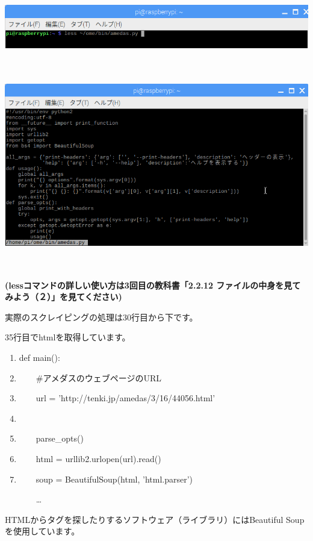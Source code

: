 \documentclass[a4paper,12pt,dvipdfmx]{jarticle}
\begin{document}
\begin{center}
\includegraphics[width=17.006cm,height=2.067cm]{textbook-img036.png}

\end{center}
\begin{center}
\includegraphics[width=17.006cm,height=9.086cm]{textbook-img037.png}

\end{center}
{\bfseries
(lessコマンドの詳しい使い方は3回目の教科書「2.2.12
ファイルの中身を見てみよう（２）」を見てください)%
}


\bigskip

\clearpage
実際のスクレイピングの処理は30行目から下です。

35行目でhtmlを取得しています。

\begin{center}
\begin{boxedminipage}{16.947cm}
\begin{enumerate}
\setlength{\itemsep}{0cm} %
\setcounter{enumi}{29}
\item def main():
\item \ \ \ \ \#アメダスのウェブページのURL
\item \ \ \ \ url = 'http://tenki.jp/amedas/3/16/44056.html'
\item 
\item \ \ \ \ parse\_opts()
\item \ \ \ \ html = urllib2.urlopen(url).read()
\item \ \ \ \ soup = BeautifulSoup(html, 'html.parser')

\ \ \ \ …
\end{enumerate}
\end{boxedminipage}
\end{center}
HTMLからタグを探したりするソフトウェア（ライブラリ）にはBeautiful
Soupを使用しています。
\end{document}

